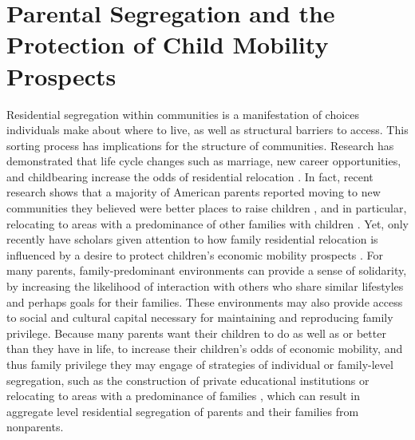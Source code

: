 \section{Parental Segregation and the Protection of Child Mobility Prospects}



Residential segregation within communities is a manifestation of choices individuals make about where to live, as well as structural barriers to access. This sorting process has implications for the structure of communities. Research has demonstrated that life cycle changes such as marriage, new career opportunities, and childbearing increase the odds of residential relocation \citep{clark_et_al_1994,rossi_and_shlay_1982,rossi_1980,davanzo_1976,clark_and_davies-withers_1999,dieleman_et_al_1995}. In fact, recent research shows that a majority of American parents reported moving to new communities they believed were better places to raise children \citep{taylor_et_al_2008}, and in particular, relocating to areas with a predominance of other families with children \citep{clark_and_davies-withers_1999,rossi_and_shlay_1982}. Yet, only recently have scholars given attention to how family residential relocation is influenced by a desire to protect children's economic mobility prospects \citep{owens_2016,beisel_1997}. For many parents, family-predominant environments can provide a sense of solidarity, by increasing the likelihood of interaction with others who share similar lifestyles and perhaps goals for their families. These environments may also provide access to social and cultural capital necessary for maintaining and reproducing family privilege. Because many parents want their children to do as well as or better than they have in life, to increase their children's odds of economic mobility, and thus family privilege they may engage of strategies of individual or family-level segregation, such as the construction of private educational institutions \citep{andrews_2002,nevin_and_bills_1976} or relocating to areas with a predominance of families \citep{owens_2016}, which can result in aggregate level residential segregation of parents and their families from nonparents. 




